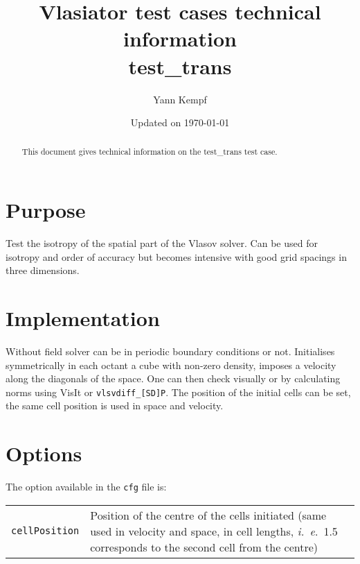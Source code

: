 \documentclass[a4paper,10pt]{scrartcl}
\title{
\Huge{Vlasiator test cases technical information} \\
\LARGE{test\_trans}
}
\author{Yann Kempf}
\date{Updated on \today}
\begin{document}
\maketitle

\begin{abstract}
   This document gives technical information on the test\_trans test case.
\end{abstract}

\section{Purpose}
Test the isotropy of the spatial part of the Vlasov solver. Can be used for isotropy and order of accuracy but becomes intensive with good grid spacings in three dimensions.


\section{Implementation}
Without field solver can be in periodic boundary conditions or not. Initialises symmetrically in each octant a cube with non-zero density, imposes a velocity along the diagonals of the space. One can then check visually or by calculating norms using VisIt or \verb=vlsvdiff_[SD]P=. The position of the initial cells can be set, the same cell position is used in space and velocity.

\section{Options}
The option available in the \verb=cfg= file is:

\begin{tabularx}{\textwidth}{lX}
   \verb=cellPosition= & Position of the centre of the cells initiated (same used in velocity and space, in cell lengths, \textit{i.\ e}.\ 1.5 corresponds to the second cell from the centre)
\end{tabularx}
\end{document}
